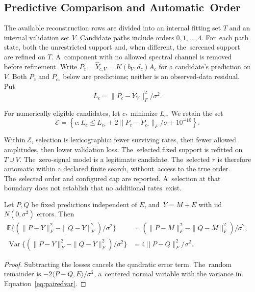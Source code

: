 \documentclass[mathematics,article,accept,moreauthors]{Definitions/mdpi}
\begin{document}
\subsection{Predictive Comparison and Automatic~Order}\label{sec:selection}
The available reconstruction rows are divided into an internal fitting set $T$ and an internal validation set $V$. Candidate paths include orders $0,1,\ldots,4$. For~each path state, both the unrestricted support and, when different, the~screened support are refined on $T$. A~component with no allowed spectral channel is removed before refinement. Write $P_c=\widehat Y_{c,V}=K(b_V,d_c)A_c$ for a candidate's prediction on $V$. Both $P_c$ and $P_{c_*}$ below are predictions; neither is an observed-data residual. Put
\begin{equation}\label{eq:val}
 L_c=\|P_c-Y_V\|_F^2/\sigma^2.
\end{equation}

For numerically eligible candidates, let $c_*$ minimize $L_c$. We retain the set
\begin{equation}\label{eq:selection}
 \mathcal E=\left\{c:L_c\leq L_{c_*}+
 2\|P_c-P_{c_*}\|_F/\sigma+10^{-10}\right\}.
\end{equation}

Within $\mathcal E$, selection is lexicographic: fewer surviving rates, then fewer allowed amplitudes, then lower validation loss. The~selected fixed support is refitted on $T\cup V$. The~zero-signal model is a legitimate candidate. The~selected $r$ is therefore automatic within a declared finite search, without~access to the true order. The~selected order and configured cap are reported. A~selection at that boundary does not establish that no additional rates~exist.

\begin{Proposition}\label{prop:paired}
Let $P,Q$ be fixed predictions independent of $E$, and~$Y=M+E$ with iid $N(0,\sigma^2)$ errors. Then
\begin{align}
 \mathbb E\{(\|P-Y\|_F^2-\|Q-Y\|_F^2)/\sigma^2\}
 &= (\|P-M\|_F^2-\|Q-M\|_F^2)/\sigma^2,\label{eq:pairedbias}\\
 \operatorname{Var}\{(\|P-Y\|_F^2-\|Q-Y\|_F^2)/\sigma^2\}
 &=4\|P-Q\|_F^2/\sigma^2.\label{eq:pairedvar}
\end{align}
\end{Proposition}
\begin{proof}
Subtracting the losses cancels the quadratic error term. The~random remainder is $-2\langle P-Q,E\rangle/\sigma^2$, a~centered normal variable with the variance in Equation~\eqref{eq:pairedvar}.
\end{proof}
\end{document}
